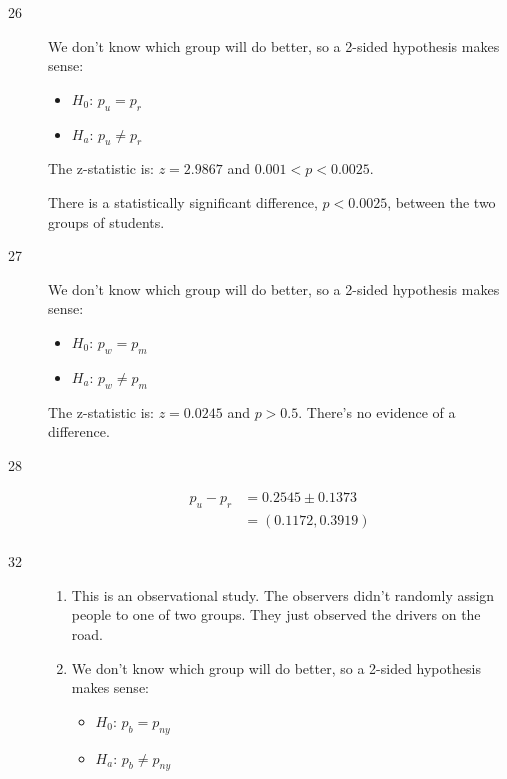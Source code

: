 \documentclass[letterpaper]{exam}
\begin{document}
\begin{description}
      \item[26]
        We don't know which group will do better, so a 2-sided hypothesis makes
        sense: 
        \begin{itemize}[label = {}, parsep = 0pt]
          \item $H_0$: $p_u = p_r$
          \item $H_a$: $p_u \ne p_r$
        \end{itemize}

        The z-statistic is: $z = 2.9867$ and $0.001 < p < 0.0025$. 

        There is a statistically significant difference, $p < 0.0025$, between the
        two groups of students.

      \item[27]
        We don't know which group will do better, so a 2-sided hypothesis makes
        sense: 
        \begin{itemize}[label = {}, parsep = 0pt]
          \item $H_0$: $p_w = p_m$
          \item $H_a$: $p_w \ne p_m$
        \end{itemize}

        The z-statistic is: $z = 0.0245$ and $p > 0.5$. There's no evidence of a
        difference.

      \item[28]
        \begin{align*}
          p_u - p_r & = 0.2545 \pm 0.1373 \\
                    & = (0.1172, 0.3919) \\
        \end{align*}

      \item[32]
        \begin{enumerate}[label = {(\alph*)}]
          \item This is an observational study. The observers didn't randomly assign
            people to one of two groups. They just observed the drivers on the road.

          \item 
            We don't know which group will do better, so a 2-sided hypothesis makes
            sense: 
            \begin{itemize}[label = {}, parsep = 0pt]
              \item $H_0$: $p_b = p_{ny}$
              \item $H_a$: $p_b \ne p_{ny}$
            \end{itemize}


\end{enumerate}
\end{description}
\end{document}
